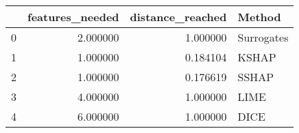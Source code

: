 \begin{tabular}{lrrl}
\toprule
 & features_needed & distance_reached & Method \\
\midrule
0 & 2.000000 & 1.000000 & Surrogates \\
1 & 1.000000 & 0.184104 & KSHAP \\
2 & 1.000000 & 0.176619 & SSHAP \\
3 & 4.000000 & 1.000000 & LIME \\
4 & 6.000000 & 1.000000 & DICE \\
\bottomrule
\end{tabular}
